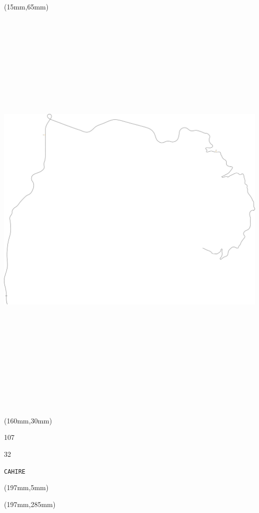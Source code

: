 \begin{textblock*}{185mm}(15mm,65mm)%
\centering
\mbox{\includegraphics[width=185mm,height=210mm,keepaspectratio]{PT/CAHIRE.pdf}}
\end{textblock*}
\begin{textblock*}{40mm}(160mm,30mm)%
\Large
\par{} 
\par107 
\par32 
\par\hfill\tiny\tt CAHIRE\\
\end{textblock*}
\begin{textblock*}{20mm}(197mm,5mm)%
\fbox{\thepage}
\label{CAHIRE}
\end{textblock*}
\begin{textblock*}{20mm}(197mm,285mm)%
\fbox{\thepage}
\end{textblock*}

